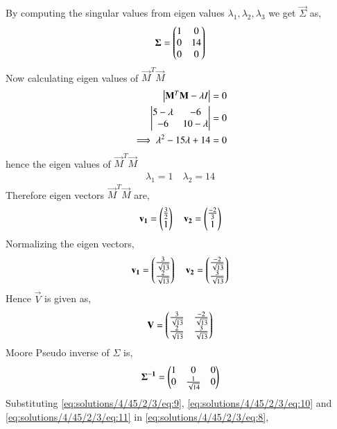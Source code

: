 By computing the singular values from eigen values $\lambda_1, \lambda_2, \lambda_3$ we get $\vec{\Sigma}$ as,
\begin{align}
\mathbf{\Sigma} = \begin{pmatrix}1&0\\0&14\\0&0\end{pmatrix}
\end{align}
Now calculating eigen values of $\vec{M}^T\vec{M}$
\begin{align}
\begin{vmatrix}\mathbf{M}^T\mathbf{M}-\lambda I\end{vmatrix}=0\\
\begin{vmatrix}5-\lambda&-6\\-6&10-\lambda\end{vmatrix}=0\\
\implies\lambda^2-15\lambda+14 =0
\end{align}
hence the eigen values of $\vec{M}^T\vec{M}$
\begin{align}
\lambda_1 = 1 \quad \lambda_2 =14
\end{align}
Therefore eigen vectors $\vec{M}^T\vec{M}$ are,
\begin{align}
\mathbf{v_1}=\begin{pmatrix}\frac{3}{2}\\1\end{pmatrix}\quad \mathbf{v_2}=\begin{pmatrix}\frac{-2}{3}\\1\end{pmatrix}
\end{align}
Normalizing the eigen vectors,
\begin{align}
\mathbf{v_1}=\begin{pmatrix}\frac{3}{\sqrt{13}}\\\frac{2}{\sqrt{13}}\end{pmatrix} \quad
\mathbf{v_2}=\begin{pmatrix}\frac{-2}{\sqrt{13}}\\\frac{3}{\sqrt{13}}\end{pmatrix}
\end{align}
Hence $\vec{V}$ is given as,
\begin{align}
\mathbf{V}= \begin{pmatrix}\frac{3}{\sqrt{13}}&\frac{-2}{\sqrt{13}}\\\frac{2}{\sqrt{13}}&\frac{3}{\sqrt{13}}\end{pmatrix} \label{eq:solutions/4/45/2/3/eq:10}
\end{align}
Moore Pseudo inverse of $\Sigma$ is,
\begin{align}
\mathbf{\Sigma^{-1}} = \begin{pmatrix}1&0&0\\0&\frac{1}{\sqrt{14}}&0\end{pmatrix} \label{eq:solutions/4/45/2/3/eq:11}
\end{align}
Substituting \eqref{eq:solutions/4/45/2/3/eq:9}, \eqref{eq:solutions/4/45/2/3/eq:10} and \eqref{eq:solutions/4/45/2/3/eq:11} in \eqref{eq:solutions/4/45/2/3/eq:8},
